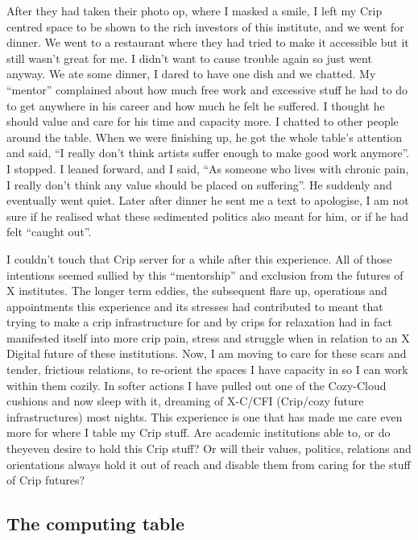 After they had taken their photo op, where I masked a smile, I left my
Crip centred space to be shown to the rich investors of this institute,
and we went for dinner. We went to a restaurant where they had tried to
make it accessible but it still wasn't great for me. I didn't want to
cause trouble again so just went anyway. We ate some dinner, I dared to
have one dish and we chatted. My ``mentor'' complained about how much
free work and excessive stuff he had to do to get anywhere in his career
and how much he felt he suffered. I thought he should value and care for
his time and capacity more. I chatted to other people around the table.
When we were finishing up, he got the whole table's attention and said,
``I really don't think artists suffer enough to make good work
anymore''. I stopped. I leaned forward, and I said, ``As someone who
lives with chronic pain, I really don't think any value should be placed
on suffering''. He suddenly and eventually went quiet. Later after
dinner he sent me a text to apologise, I am not sure if he realised what
these sedimented politics also meant for him, or if he had felt ``caught
out''.

I couldn't touch that Crip server for a while after this experience. All
of those intentions seemed sullied by this ``mentorship'' and exclusion
from the futures of X institutes. The longer term eddies, the subsequent
flare up, operations and appointments this experience and its stresses
had contributed to meant that trying to make a crip infrastructure for
and by crips for relaxation had in fact manifested itself into more crip
pain, stress and struggle when in relation to an X Digital future of
these institutions. Now, I am moving to care for these scars and tender,
frictious relations, to re-orient the spaces I have capacity in so I can
work within them cozily. In softer actions I have pulled out one of the
Cozy-Cloud cushions and now sleep with it, dreaming of X-C/CFI
(Crip/cozy future infrastructures) most nights. This experience is one
that has made me care even more for where I table my Crip stuff. Are
academic institutions able to, or do theyeven desire to hold this Crip
stuff? Or will their values, politics, relations and orientations always
hold it out of reach and disable them from caring for the stuff of Crip
futures?

\hypertarget{the-computing-table}{%
\subsection{The computing table}\label{the-computing-table}}

